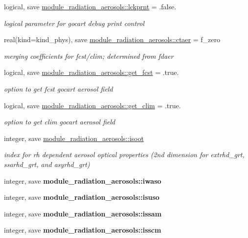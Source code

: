 \begin{DoxyCompactItemize}
logical, save \hyperlink{group__module__radiation__aerosols_ga018d5414597049069c1ddd1094285371}{module\+\_\+radiation\+\_\+aerosols\+::lckprnt} = .false.
\begin{DoxyCompactList}\small\item\em logical parameter for gocart debug print control \end{DoxyCompactList}\item 
real(kind=kind\+\_\+phys), save \hyperlink{group__module__radiation__aerosols_ga4b0aa142aee31c40361dadc390ccc68e}{module\+\_\+radiation\+\_\+aerosols\+::ctaer} = f\+\_\+zero
\begin{DoxyCompactList}\small\item\em merging coefficients for fcst/clim; determined from fdaer \end{DoxyCompactList}\item 
logical, save \hyperlink{group__module__radiation__aerosols_ga36f851e49de5e1f7da38da5fa6ea445c}{module\+\_\+radiation\+\_\+aerosols\+::get\+\_\+fcst} = .true.
\begin{DoxyCompactList}\small\item\em option to get fcst gocart aerosol field \end{DoxyCompactList}\item 
logical, save \hyperlink{group__module__radiation__aerosols_ga7fe1943010fe47c9d86ef4c993848459}{module\+\_\+radiation\+\_\+aerosols\+::get\+\_\+clim} = .true.
\begin{DoxyCompactList}\small\item\em option to get clim gocart aerosol field \end{DoxyCompactList}\item 
integer, save \hyperlink{group__module__radiation__aerosols_gaa9aa876f65d1e1e971607bff4ffbddad}{module\+\_\+radiation\+\_\+aerosols\+::isoot}
\begin{DoxyCompactList}\small\item\em index for rh dependent aerosol optical properties (2nd dimension for extrhd\+\_\+grt, ssarhd\+\_\+grt, and asyrhd\+\_\+grt) \end{DoxyCompactList}\item 
integer, save {\bfseries module\+\_\+radiation\+\_\+aerosols\+::iwaso}
\item 
integer, save {\bfseries module\+\_\+radiation\+\_\+aerosols\+::isuso}
\item 
integer, save {\bfseries module\+\_\+radiation\+\_\+aerosols\+::issam}
\item 
integer, save {\bfseries module\+\_\+radiation\+\_\+aerosols\+::isscm}

\end{DoxyCompactItemize}
